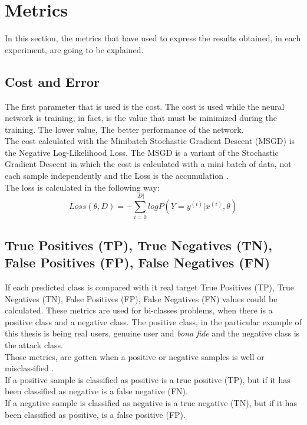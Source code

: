 \section{Metrics}
In this section, the metrics that have used to express the results obtained, in each experiment, are going to be explained.

\subsection{Cost and Error}
The first parameter that is used is the cost. The cost is used while the neural network is training, in fact, is the value that must be minimized during the training. The lower value, The better performance of the network.\\

The cost calculated with the Minibatch Stochastic Gradient Descent (MSGD) is the Negative Log-Likelihood Loss. The MSGD is a variant of the Stochastic Gradient Descent in which the cost is calculated with a mini batch of data, not each sample independently and the Loss is the accumulation \cite{Stutz}.\\

The loss is calculated in the following way:\\

\begin{equation}
  Loss(\theta, D) = - \sum_{i=0}^{|D|}log P(Y = y^{(i)}|x^{(i)}, \theta)
\end{equation}


\subsection{True Positives (TP), True Negatives (TN), False Positives (FP), False Negatives (FN)}
If each predicted class is compared with it real target True Positives (TP), True Negatives (TN), False Positives (FP), False Negatives (FN) values could be calculated. These metrics are used for bi-classes problems, when there is a positive class and a negative class. The positive class, in the particular example of this thesis is being real users, genuine user and \textit{bona fide} and the negative class is the attack class.\\

Those metrics, are gotten when a positive or negative samples is well or misclassified \cite{Sokolova}.\\

If a positive sample is classified as positive is a true positive (TP), but if it has been classified as negative is a false negative (FN).\\
If a negative sample is classified as negative is a true negative (TN), but if it has been classified as positive, is a false positive (FP).\\

